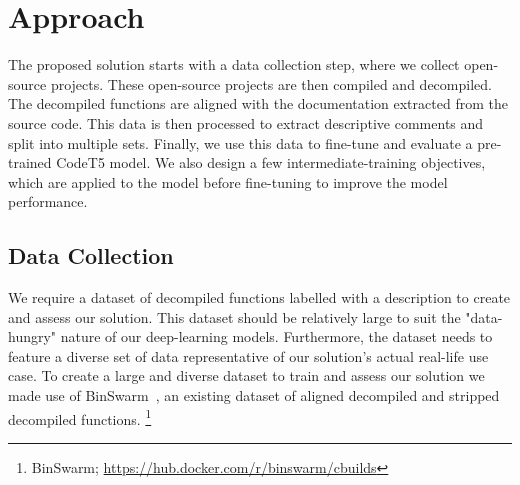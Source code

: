 \chapter{Approach}
\label{methodology}

The proposed solution starts with a data collection step, where we collect open-source projects. These open-source projects are then compiled and decompiled. The decompiled functions are aligned with the documentation extracted from the source code. This data is then processed to extract descriptive comments and split into multiple sets. Finally, we use this data to fine-tune and evaluate a pre-trained CodeT5 model. We also design a few intermediate-training objectives, which are applied to the model before fine-tuning to improve the model performance. 


\section{Data Collection}
We require a dataset of decompiled functions labelled with a description to create and assess our solution. This dataset should be relatively large to suit the "data-hungry" nature of our deep-learning models. Furthermore, the dataset needs to feature a diverse set of data representative of our solution's actual real-life use case. 
To create a large and diverse dataset to train and assess our solution we made use of BinSwarm~\cite{InlinedFunc}, an existing dataset of aligned decompiled and stripped decompiled functions. \footnote{BinSwarm; \url{https://hub.docker.com/r/binswarm/cbuilds}}

